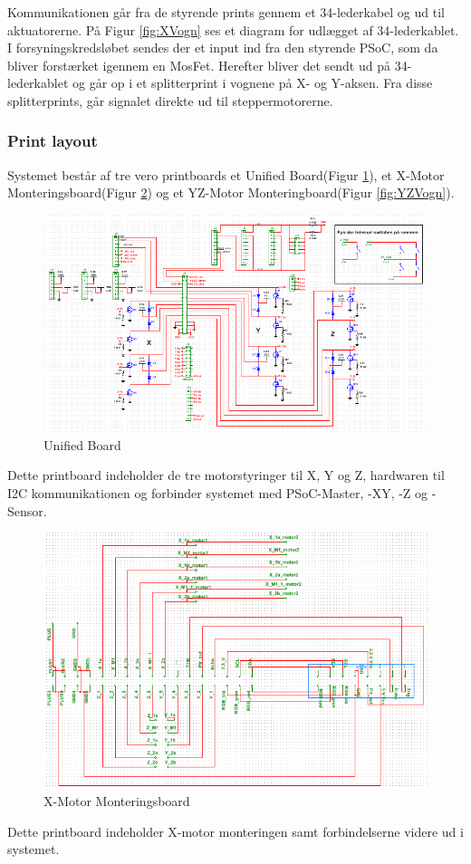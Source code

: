 Kommunikationen går fra de styrende prints gennem et 34-lederkabel og ud til aktuatorerne. På Figur \ref{fig:XVogn} ses et diagram for udlægget af 34-lederkablet. I forsyningskredsløbet sendes der et input ind fra den styrende PSoC, som da bliver forstærket igennem en MosFet. Herefter bliver det sendt ud på 34-lederkablet og går op i et splitterprint i vognene på X- og Y-aksen. Fra disse splitterprints, går signalet direkte ud til steppermotorerne. 


\subsubsection{Print layout}

Systemet består af tre vero printboards et Unified Board(Figur \ref{fig:UniBoard}), et X-Motor Monteringsboard(Figur \ref{fig:XVogn1}) og et YZ-Motor Monteringboard(Figur \ref{fig:YZVogn}).

\begin{figure}[H] \centering
    \includegraphics[width=\linewidth]{0_Filer/Figuer/5_HW_Design/UnifiedBoard.PNG}
    \caption{Unified Board}
    \label{fig:UniBoard}
\end{figure}
Dette printboard indeholder de tre motorstyringer til X, Y og Z, hardwaren til I2C kommunikationen og forbinder systemet med PSoC-Master, -XY, -Z og -Sensor.

\begin{figure}[H] \centering
    \includegraphics[width=\linewidth]{0_Filer/Figuer/5_HW_Design/XVogn.PNG}
    \caption{X-Motor Monteringsboard}
    \label{fig:XVogn1}
\end{figure}
Dette printboard indeholder X-motor monteringen samt forbindelserne videre ud i systemet.

